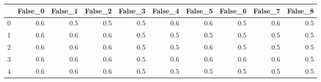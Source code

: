 \begin{tabular}{lrrrrrrrrr}
\toprule
{} &  False\_0 &  False\_1 &  False\_2 &  False\_3 &  False\_4 &  False\_5 &  False\_6 &  False\_7 &  False\_8 \\ \hline
\midrule
0 &      0.6 &      0.5 &      0.5 &      0.5 &      0.6 &      0.6 &      0.5 &      0.6 &      0.5 \\ \hline
1 &      0.6 &      0.6 &      0.6 &      0.5 &      0.5 &      0.5 &      0.5 &      0.5 &      0.5 \\ \hline
2 &      0.6 &      0.6 &      0.6 &      0.5 &      0.5 &      0.6 &      0.5 &      0.5 &      0.5 \\ \hline
3 &      0.6 &      0.6 &      0.6 &      0.5 &      0.6 &      0.6 &      0.6 &      0.6 &      0.5 \\ \hline
4 &      0.6 &      0.6 &      0.6 &      0.5 &      0.5 &      0.5 &      0.5 &      0.5 &      0.5 \\ \hline
\bottomrule
\end{tabular}
